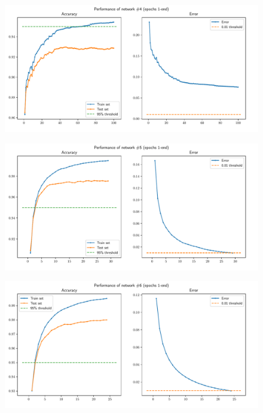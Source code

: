\documentclass[letterpaper,headings=standardclasses]{scrartcl}
\begin{document}
\begin{figure}[p]
    \centering
    \includegraphics[width=.9\linewidth]{net4.pdf}
    \label{net4}
\end{figure}

\begin{figure}[p]
    \centering
    \includegraphics[width=.9\linewidth]{net5.pdf}
    \label{net5}
\end{figure}

\begin{figure}[p]
    \centering
    \includegraphics[width=.9\linewidth]{net6.pdf}
    \label{net6}
\end{figure}
\end{document}
